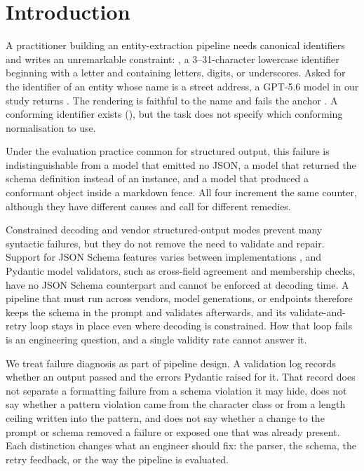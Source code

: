 \section{Introduction}
\label{sec:intro}

A practitioner building an entity-extraction pipeline needs canonical
identifiers and writes an unremarkable constraint: \idpattern, a
3--31-character lowercase identifier beginning with a letter and
containing letters, digits, or underscores. Asked for the identifier of
an entity whose name is a street address, a GPT-5.6 model in our study
returns . The rendering is faithful to the name and
fails the anchor \code{\textasciicircum{}[a-z]}. A conforming identifier exists
(), but the task does not specify which
conforming normalisation to use.

Under the evaluation practice common for structured output, this failure
is indistinguishable from a model that emitted no JSON, a model that
returned the schema definition instead of an instance, and a model that
produced a conformant object inside a markdown fence. All four increment
the same counter, although they have different causes and call for
different remedies.

Constrained decoding and vendor structured-output modes prevent many
syntactic failures, but they do not remove the need to validate and
repair. Support for JSON Schema features varies between implementations
\citep{geng2025jsonschemabench}, and Pydantic model validators, such as
cross-field agreement and membership checks, have no JSON Schema
counterpart and cannot be enforced at decoding time. A pipeline that
must run across vendors, model generations, or endpoints therefore
keeps the schema in the prompt and validates afterwards, and its
validate-and-retry loop stays in place even where decoding is
constrained. How that loop fails is an engineering question, and a single validity
rate cannot answer it.

We treat failure diagnosis as part of pipeline design. A validation log
records whether an output passed and the errors Pydantic raised for it.
That record does not separate a formatting failure from a schema
violation it may hide, does not say whether a pattern violation came from
the character class or from a length ceiling written into the pattern,
and does not say whether a change to the prompt or schema removed a
failure or exposed one that was already present. Each distinction changes
what an engineer should fix: the parser, the schema, the retry feedback,
or the way the pipeline is evaluated.

